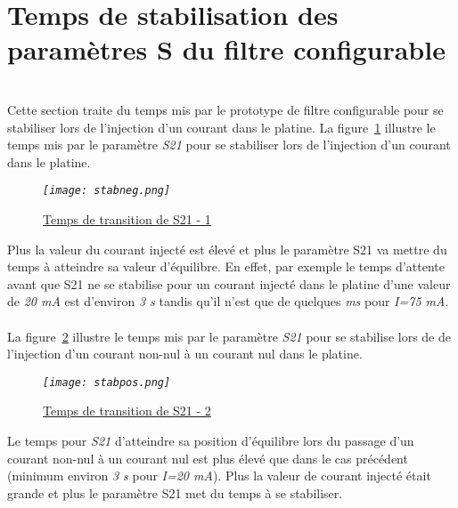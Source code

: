 \documentclass[12pt,fleqn]{book} %
\begin{document}
\section{Temps de stabilisation des paramètres S du filtre configurable}
~\\\noindent Cette section traite du temps mis par le prototype de filtre configurable pour se stabiliser lors de l'injection d'un courant dans le platine.
\noindent La figure~\underline{\color{blue}\ref{stabneg}} illustre le temps mis par le paramètre \emph{S21} pour se stabiliser lors de l'injection d'un courant dans le platine.
\begin{figure}[H]
	\centering
	\itshape
	\texttt{[image: stabneg.png]}
	\caption{\label{stabneg} \underline{Temps de transition de S21 - 1}}
\end{figure}
\noindent Plus la valeur du courant injecté est élevé et plus le paramètre S21 va mettre du temps à atteindre sa valeur d'équilibre. En effet, par exemple le temps d'attente avant que S21 ne se stabilise pour un courant injecté dans le platine d'une valeur de \emph{20 mA} est d'environ \emph{3 s} tandis qu'il n'est que de quelques \emph{ms} pour \emph{I=75 mA}.
~\\\noindent La figure~\underline{\color{blue}\ref{stabpos}} illustre le temps mis par le paramètre \emph{S21} pour se stabilise lors de de l'injection d'un courant non-nul à un courant nul dans le platine.
\begin{figure}[H]
	\centering
	\itshape
	\texttt{[image: stabpos.png]}
	\caption{\label{stabpos} \underline{Temps de transition de S21 - 2}}
\end{figure}
\noindent Le temps pour \emph{S21} d'atteindre sa position d'équilibre lors du passage d'un courant non-nul à un courant nul est plus élevé que dans le cas précédent (minimum environ \emph{3 s} pour \emph{I=20 mA}). Plus la valeur de courant injecté était grande et plus le paramètre S21 met du temps à se stabiliser.
\end{document}
